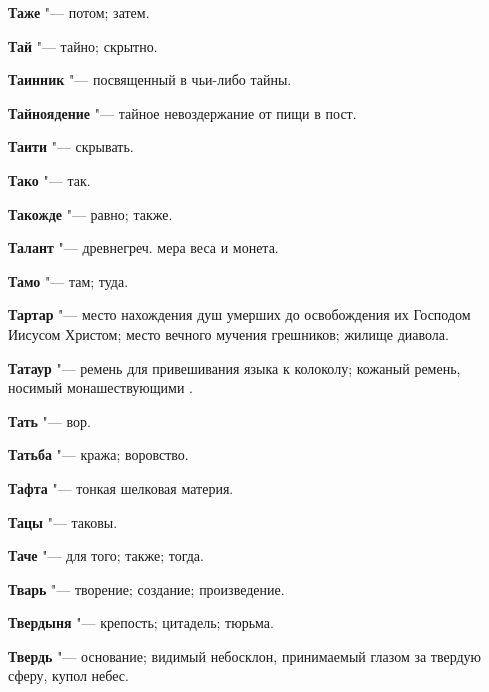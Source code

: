 \begin{mymulticols}{2}
\noindent\textbf{Таже} "--- потом; затем. 




\noindent\textbf{Тай} "--- тайно; скрытно. 




\noindent\textbf{Таинник} "--- посвященный в чьи-либо тайны. 




\noindent\textbf{Тайноядение} "--- тайное невоздержание от пищи в пост. 




\noindent\textbf{Таити} "--- скрывать. 




\noindent\textbf{Тако} "--- так. 




\noindent\textbf{Такожде} "--- равно; также. 




\noindent\textbf{Талант} "--- древнегреч. мера веса и монета. 




\noindent\textbf{Тамо} "--- там; туда. 




\noindent\textbf{Тартар} "--- место нахождения душ умерших до освобождения их Господом Иисусом Христом; место вечного мучения грешников; жилище диавола. 




\noindent\textbf{Татаур} "--- ремень для привешивания языка к колоколу; кожаный ремень, носимый монашествующими . 




\noindent\textbf{Тать} "--- вор. 




\noindent\textbf{Татьба} "--- кража; воровство. 




\noindent\textbf{Тафта} "--- тонкая шелковая материя. 




\noindent\textbf{Тацы} "--- таковы. 




\noindent\textbf{Таче} "--- для того; также; тогда. 




\noindent\textbf{Тварь} "--- творение; создание; произведение. 




\noindent\textbf{Твердыня} "--- крепость; цитадель; тюрьма. 




\noindent\textbf{Твердь} "--- основание; видимый небосклон, принимаемый глазом за твердую сферу, купол небес. 





\end{mymulticols}
